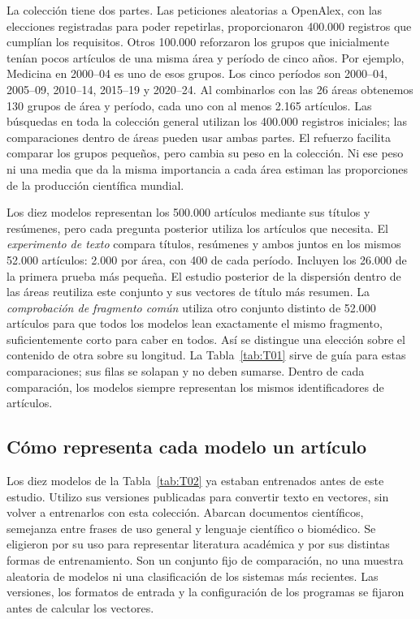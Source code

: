 \documentclass[12pt]{article}
\begin{document}
La colección tiene dos partes. Las peticiones aleatorias a OpenAlex, con las elecciones registradas para poder repetirlas, proporcionaron 400.000 registros que cumplían los requisitos. Otros 100.000 reforzaron los grupos que inicialmente tenían pocos artículos de una misma área y período de cinco años. Por ejemplo, Medicina en 2000--04 es uno de esos grupos. Los cinco períodos son 2000--04, 2005--09, 2010--14, 2015--19 y 2020--24. Al combinarlos con las 26 áreas obtenemos 130 grupos de área y período, cada uno con al menos 2.165 artículos. Las búsquedas en toda la colección general utilizan los 400.000 registros iniciales; las comparaciones dentro de áreas pueden usar ambas partes. El refuerzo facilita comparar los grupos pequeños, pero cambia su peso en la colección. Ni ese peso ni una media que da la misma importancia a cada área estiman las proporciones de la producción científica mundial.

Los diez modelos representan los 500.000 artículos mediante sus títulos y resúmenes, pero cada pregunta posterior utiliza los artículos que necesita. El \emph{experimento de texto} compara títulos, resúmenes y ambos juntos en los mismos 52.000 artículos: 2.000 por área, con 400 de cada período. Incluyen los 26.000 de la primera prueba más pequeña. El estudio posterior de la dispersión dentro de las áreas reutiliza este conjunto y sus vectores de título más resumen. La \emph{comprobación de fragmento común} utiliza otro conjunto distinto de 52.000 artículos para que todos los modelos lean exactamente el mismo fragmento, suficientemente corto para caber en todos. Así se distingue una elección sobre el contenido de otra sobre su longitud. La Tabla~\ref{tab:T01} sirve de guía para estas comparaciones; sus filas se solapan y no deben sumarse. Dentro de cada comparación, los modelos siempre representan los mismos identificadores de artículos.


\subsection{Cómo representa cada modelo un artículo}
Los diez modelos de la Tabla~\ref{tab:T02} ya estaban entrenados antes de este estudio. Utilizo sus versiones publicadas para convertir texto en vectores, sin volver a entrenarlos con esta colección. Abarcan documentos científicos, semejanza entre frases de uso general y lenguaje científico o biomédico. Se eligieron por su uso para representar literatura académica y por sus distintas formas de entrenamiento. Son un conjunto fijo de comparación, no una muestra aleatoria de modelos ni una clasificación de los sistemas más recientes. Las versiones, los formatos de entrada y la configuración de los programas se fijaron antes de calcular los vectores.
\end{document}

